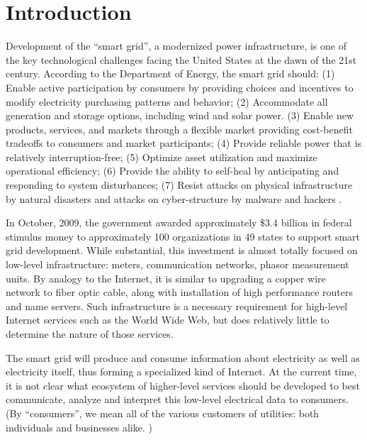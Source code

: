 
\section{Introduction}

Development of the ``smart grid'', a modernized power infrastructure, is
one of the key technological challenges facing the United States at the
dawn of the 21st century. According to the Department of Energy, the smart
grid should: (1) Enable active participation by consumers by providing
choices and incentives to modify electricity purchasing patterns and
behavior; (2) Accommodate all generation and storage options, including
wind and solar power.  (3) Enable new products, services, and markets
through a flexible market providing cost-benefit tradeoffs to consumers and
market participants; (4) Provide reliable power that is relatively
interruption-free; (5) Optimize asset utilization and maximize operational
efficiency; (6) Provide the ability to self-heal by anticipating and
responding to system disturbances; (7) Resist attacks on physical
infrastructure by natural disasters and attacks on cyber-structure by
malware and hackers \cite{NETL:GridCharacteristics}.

In October, 2009, the government awarded approximately \$3.4 billion in
federal stimulus money to approximately 100 organizations in 49 states to
support smart grid development.  While substantial, this investment is
almost totally focused on low-level infrastructure: meters, communication
networks, phasor measurement units.  By analogy to the Internet, it is
similar to upgrading a copper wire network to fiber optic cable, along with
installation of high performance routers and name servers.  Such
infrastructure is a necessary requirement for high-level Internet services
such as the World Wide Web, but does relatively little to determine the
nature of those services.

The smart grid will produce and consume information about electricity as
well as electricity itself, thus forming a specialized kind of Internet. At
the current time, it is not clear what ecosystem of higher-level services
should be developed to best communicate, analyze and interpret this
low-level electrical data to consumers.  (By ``consumers'', we mean all of
the various customers of utilities: both individuals and businesses
alike. )

